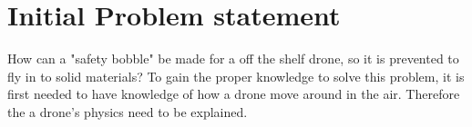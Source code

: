 \section{Initial Problem statement}\label{s:initial_problem}
How can a "safety bobble" be made for a off the shelf drone, so it is prevented to fly in to solid materials?
\newline
To gain the proper knowledge to solve this problem, it is first needed to have knowledge of how a drone move around in the air. Therefore the a drone's physics need to be explained.
